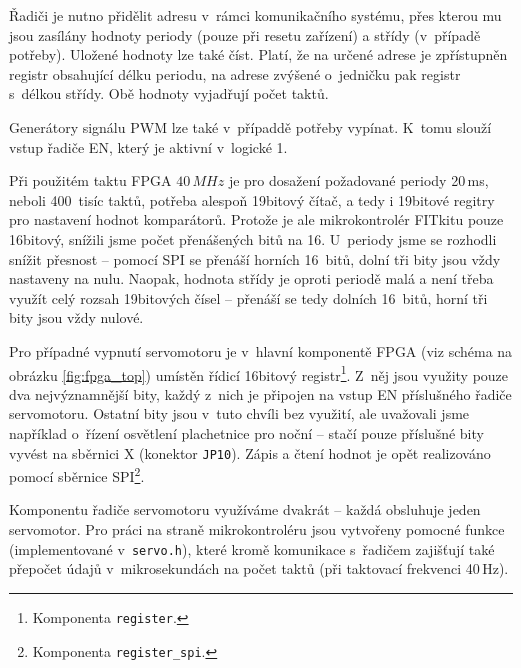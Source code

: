 Řadiči je nutno přidělit adresu v~rámci komunikačního systému, přes kterou mu
jsou zasílány hodnoty periody (pouze při resetu zařízení) a střídy (v~případě
potřeby). Uložené hodnoty lze také číst. Platí, že na určené adrese je
zpřístupněn registr obsahující délku periodu, na adrese zvýšené o~jedničku pak
registr s~délkou střídy. Obě hodnoty vyjadřují počet taktů.

Generátory signálu PWM lze také v~případdě potřeby vypínat. K~tomu slouží vstup
řadiče EN, který je aktivní v~logické 1.

Při použitém taktu FPGA $40\,MHz$ je pro dosažení požadované periody 20\,ms,
neboli 400~tisíc taktů, potřeba alespoň 19bitový čítač, a tedy i 19bitové
regitry pro nastavení hodnot komparátorů. Protože je ale mikrokontrolér FITkitu
pouze 16bitový, snížili jsme počet přenášených bitů na 16. U~periody jsme se
rozhodli snížit přesnost -- pomocí SPI se přenáší horních 16~bitů, dolní tři
bity jsou vždy nastaveny na nulu. Naopak, hodnota střídy je oproti periodě malá
a není třeba využít celý rozsah 19bitových čísel -- přenáší se tedy dolních
16~bitů, horní tři bity jsou vždy nulové.

Pro případné vypnutí servomotoru je v~hlavní komponentě FPGA (viz schéma na
obrázku \ref{fig:fpga_top}) umístěn řídicí 16bitový registr\footnote{Komponenta
\texttt{register}.}. Z~něj jsou využity pouze dva nejvýznamnější bity, každý
z~nich je připojen na vstup EN příslušného řadiče servomotoru. Ostatní bity jsou
v~tuto chvíli bez využití, ale uvažovali jsme například o~řízení osvětlení
plachetnice pro noční  -- stačí pouze příslušné bity vyvést na
sběrnici X (konektor \texttt{JP10}). Zápis a čtení hodnot je opět realizováno
pomocí sběrnice SPI\footnote{Komponenta \texttt{register\_spi}.}.

Komponentu řadiče servomotoru využíváme dvakrát -- každá obsluhuje jeden
servomotor. Pro práci na straně mikrokontroléru jsou vytvořeny pomocné funkce
(implementované v~\texttt{servo.h}), které kromě komunikace s~řadičem zajišťují
také přepočet údajů v~mikrosekundách na počet taktů (při taktovací frekvenci
40\,Hz).




